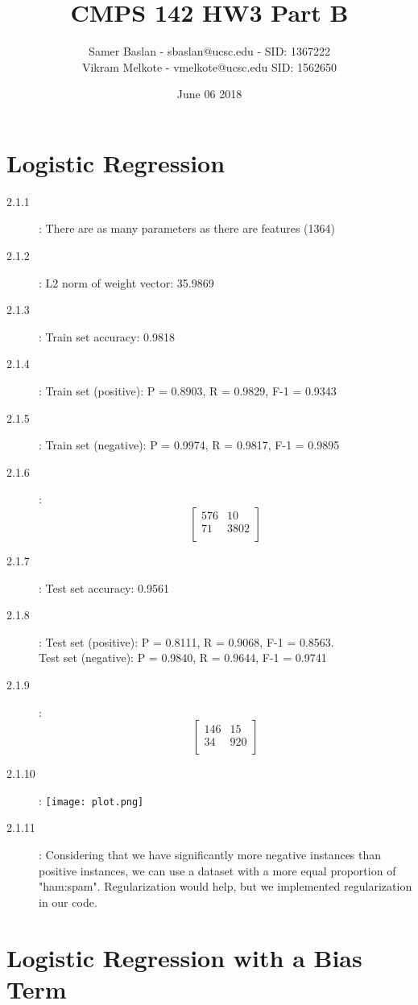 \documentclass{article}
\title{CMPS 142 HW3 Part B}
\author{Samer Baslan - sbaslan@ucsc.edu - SID: 1367222 \\ Vikram Melkote - vmelkote@ucsc.edu SID: 1562650}
\date{June 06 2018}
\begin{document}
\maketitle

\section{Logistic Regression}

\begin{description}
    \item[2.1.1]: There are as many parameters as there are features (1364)
    \item[2.1.2]: L2 norm of weight vector: 35.9869 
    \item[2.1.3]: Train set accuracy: 0.9818
    \item[2.1.4]: Train set (positive): P = 0.8903, R = 0.9829, F-1 = 0.9343
    \item[2.1.5]: Train set (negative): P = 0.9974, R = 0.9817, F-1 = 0.9895
    \item[2.1.6]: \[
\begin{bmatrix}
    {576}      & {10}\\
    {71}       & {3802} \\
    \end{bmatrix}
    \]
    
    \item[2.1.7]: Test set accuracy: 0.9561
    \item[2.1.8]: Test set (positive): P = 0.8111, R = 0.9068, F-1 = 0.8563. \\ Test set (negative): P = 0.9840, R = 0.9644, F-1 = 0.9741
    \item[2.1.9]: \[
\begin{bmatrix}
    {146}      & {15}\\
    {34}       & {920} \\
    \end{bmatrix}
    \]
    \item[2.1.10]: \texttt{[image: plot.png]}
    \item[2.1.11]: Considering that we have significantly more negative instances than positive instances, we can use a dataset with a more equal proportion of "ham:spam". Regularization would help, but we implemented regularization in our code.
\end{description}

\section{Logistic Regression with a Bias Term}
\end{document}
